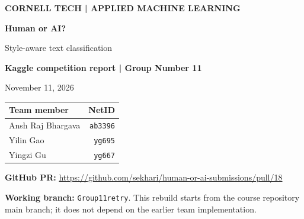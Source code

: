 \documentclass[10pt,letterpaper]{article}
\begin{document}
\thispagestyle{empty}
{\color{teal}\bfseries CORNELL TECH | APPLIED MACHINE LEARNING}\par
\vspace{0.18in}
{\Huge\bfseries\color{navy}Human or AI?}\par
\vspace{0.07in}
{\LARGE\color{navy}Style-aware text classification}\par
\vspace{0.16in}
\textbf{Kaggle competition report | Group Number 11}\par

November 11, 2026\par\vspace{0.1in}
\begin{tabularx}{\linewidth}{@{}Yr@{}}
\toprule
Team member & NetID \\ \midrule
Ansh Raj Bhargava & \texttt{ab3396} \\
Yilin Gao & \texttt{yg695} \\
Yingzi Gu & \texttt{yg667} \\
\bottomrule
\end{tabularx}

\textbf{GitHub PR:} \url{https://github.com/sekhari/human-or-ai-submissions/pull/18}\par
\textbf{Working branch:} \texttt{Group11retry}. This rebuild starts from the course repository main branch; it does not depend on the earlier team implementation.
\end{document}
